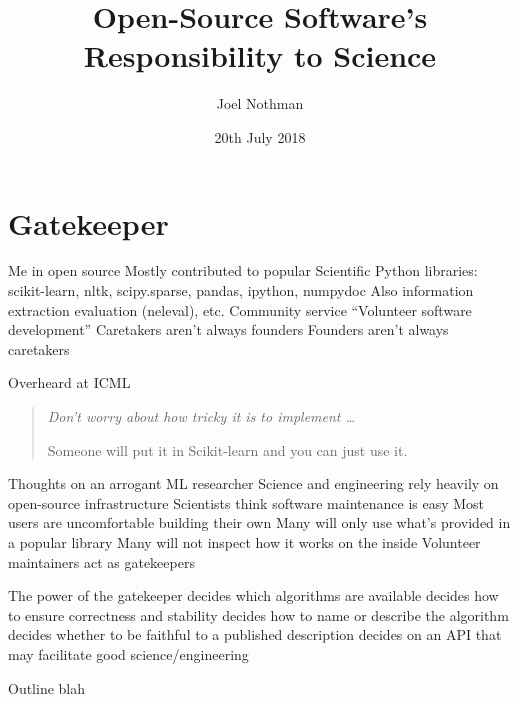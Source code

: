 \documentclass[aspectratio=169, 22pt]{beamer}
\title{Open-Source Software's Responsibility to Science}
\subtitle{}
\date{20th July 2018}
\author{Joel Nothman}
\newcommand{\hl}{\textcolor{usydred}}
\begin{document}
\titleslide

\section{Gatekeeper}

\begin{points}{Me in open source}
	\p Mostly contributed to popular Scientific Python libraries:\\
	scikit-learn, nltk, scipy.sparse, pandas, ipython, numpydoc
	\p Also information extraction evaluation (neleval), etc.
	\vfill
	\p Community service
	\p ``Volunteer software development''
	\vfill
	\p Caretakers aren't always founders
	\p Founders aren't always caretakers
\end{points}

\begin{centre}{Overheard at ICML}
	\begin{quote}
		\Large
		\it
	Don't worry about how tricky it is to implement \ldots

	\vspace{2em}

	\raggedleft Someone will put it in Scikit-learn and you can just use it.
	\end{quote}
\end{centre}

\begin{points}{Thoughts on an arrogant ML researcher}
	\p Science and engineering rely heavily on open-source \hl{infrastructure}
	\p Scientists think software maintenance is easy
	\p Most users are uncomfortable building their own
	\p Many will only use what's provided in a popular library
	\p Many will not inspect how it works on the inside
	\p Volunteer maintainers act as gatekeepers
\end{points}

\begin{points}{The power of the gatekeeper}
	\p decides \hl{which algorithms} are available
	\p decides how to ensure \hl{correctness} and stability
	\p decides how to \hl{name} or describe the algorithm
	\p decides whether to be \hl{faithful} to a published description
	\p decides on an \hl{API} that may facilitate good science/engineering
\end{points}

\begin{points}{Outline}
	\p blah
\end{points}
\end{document}
